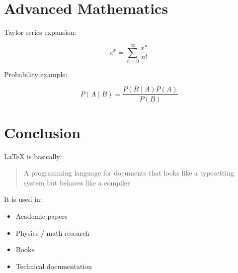 \documentclass[11pt]{article}
\begin{document}
\section{Advanced Mathematics}

Taylor series expansion:

\begin{equation}
e^x = \sum_{n=0}^{\infty} \frac{x^n}{n!}
\end{equation}

Probability example:

\begin{equation}
P(A \mid B) = \frac{P(B \mid A)P(A)}{P(B)}
\end{equation}

\section{Conclusion}

LaTeX is basically:
\begin{quote}
A programming language for documents that looks like a typesetting system but behaves like a compiler.
\end{quote}

It is used in:
\begin{itemize}
    \item Academic papers
    \item Physics / math research
    \item Books
    \item Technical documentation
\end{itemize}
\end{document}
